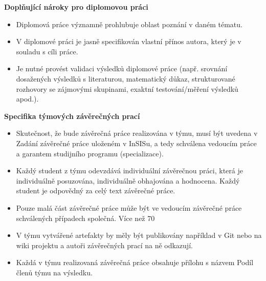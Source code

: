 {\bfseries\sffamily\Large Doplňující nároky pro diplomovou práci}
\begin{itemize}
\item \vspace*{-2ex}Diplomová práce významně prohlubuje oblast poznání v daném tématu.
\item V diplomové práci je jasně specifikován vlastní přínos autora, který je v souladu s cíli práce. 
\item Je nutné provést validaci výsledků diplomové práce (např. srovnání dosažených výsledků s literaturou, matematický důkaz, strukturované rozhovory se zájmovými skupinami, exaktní testování/měření výsledků apod.).
\end{itemize}

{\bfseries\sffamily\Large Specifika týmových závěrečných prací}
\begin{itemize}
\item \vspace*{-2ex}Skutečnost, že bude závěrečná práce realizována v týmu, musí být uvedena v Zadání závěrečné práce uloženém v InSISu, a tedy schválena vedoucím práce a garantem studijního programu (specializace).
\item Každý student z týmu odevzdává individuální závěrečnou práci, která je individuálně posuzována, individuálně obhajována a hodnocena. Každý student je odpovědný za celý text závěrečné práce.
\item Pouze malá část závěrečné práce může být ve vedoucím závěrečné práce schválených případech společná. Více než 70 %
\item V týmu vytvářené artefakty by měly být publikovány například v Git nebo na wiki projektu a autoři závěrečných prací na ně odkazují.
\item Každá v týmu realizovaná závěrečná práce obsahuje přílohu s názvem Podíl členů týmu na výsledku.
\end{itemize}
